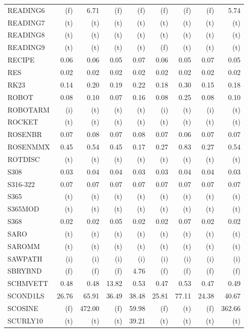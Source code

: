 \documentclass[11pt,twoside]{article}
\begin{document}
{\begin{longtable}[c]{|l|r|r|r|r|r|r|r|r|}
READING6 & (f) & 6.71 & (f) & (f) & (f) & (f) & (f) & 5.74 \\
READING7 & (t) & (t) & (t) & (t) & (t) & (t) & (t) & (t) \\
READING8 & (t) & (t) & (t) & (t) & (t) & (t) & (t) & (t) \\
READING9 & (t) & (t) & (t) & (t) & (f) & (t) & (t) & (t) \\
RECIPE & 0.06 & 0.06 & 0.05 & 0.07 & 0.06 & 0.05 & 0.07 & 0.05 \\
RES & 0.02 & 0.02 & 0.02 & 0.02 & 0.02 & 0.02 & 0.02 & 0.02 \\
RK23 & 0.14 & 0.20 & 0.19 & 0.22 & 0.18 & 0.30 & 0.15 & 0.18 \\
ROBOT & 0.08 & 0.10 & 0.07 & 0.16 & 0.08 & 0.25 & 0.08 & 0.10 \\
ROBOTARM & (i) & (t) & (t) & (t) & (i) & (t) & (i) & (t) \\
ROCKET & (t) & (t) & (t) & (t) & (t) & (t) & (t) & (t) \\
ROSENBR & 0.07 & 0.08 & 0.07 & 0.08 & 0.07 & 0.06 & 0.07 & 0.07 \\
ROSENMMX & 0.45 & 0.54 & 0.45 & 0.17 & 0.27 & 0.83 & 0.27 & 0.54 \\
ROTDISC & (t) & (t) & (t) & (t) & (t) & (t) & (t) & (t) \\
S308 & 0.03 & 0.04 & 0.04 & 0.03 & 0.03 & 0.04 & 0.04 & 0.03 \\
S316-322 & 0.07 & 0.07 & 0.07 & 0.07 & 0.07 & 0.07 & 0.07 & 0.07 \\
S365 & (t) & (t) & (t) & (t) & (t) & (t) & (t) & (t) \\
S365MOD & (t) & (t) & (t) & (t) & (t) & (t) & (t) & (t) \\
S368 & 0.02 & 0.02 & 0.05 & 0.02 & 0.02 & 0.07 & 0.02 & 0.02 \\
SARO & (t) & (t) & (t) & (t) & (t) & (t) & (t) & (t) \\
SAROMM & (t) & (t) & (t) & (t) & (t) & (t) & (t) & (t) \\
SAWPATH & (i) & (i) & (i) & (i) & (i) & (i) & (i) & (i) \\
SBRYBND & (f) & (f) & (f) & 4.76 & (f) & (f) & (f) & (f) \\
SCHMVETT & 0.48 & 0.48 & 13.82 & 0.53 & 0.47 & 0.53 & 0.47 & 0.49 \\
SCOND1LS & 26.76 & 65.91 & 36.49 & 38.48 & 25.81 & 77.11 & 24.38 & 40.67 \\
SCOSINE & (f) & 472.00 & (f) & 59.98 & (f) & (t) & (f) & 362.66 \\
SCURLY10 & (t) & (t) & (t) & 39.21 & (t) & (t) & (t) & (t) \\

\end{longtable}}
\end{document}
